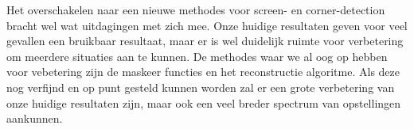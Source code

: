 Het overschakelen naar een nieuwe methodes voor screen- en corner-detection bracht wel wat uitdagingen met zich mee. Onze huidige resultaten geven voor veel gevallen een bruikbaar resultaat, maar er is wel duidelijk ruimte voor verbetering om meerdere situaties aan te kunnen. De methodes waar we al oog op hebben voor vebetering zijn de maskeer functies en het reconstructie algoritme. Als deze nog verfijnd en op punt gesteld kunnen worden zal er een grote verbetering van onze huidige resultaten zijn, maar ook een veel breder spectrum van opstellingen aankunnen.